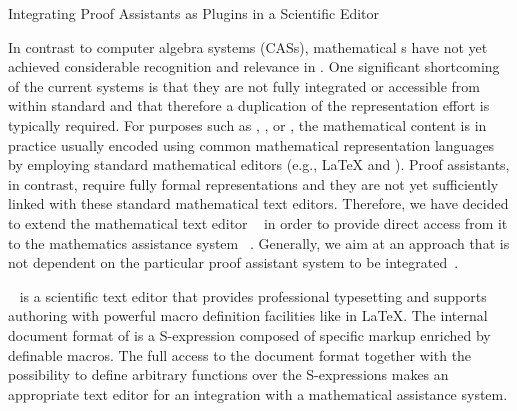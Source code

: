 
\begin{omgroup}[id=texmacs-omega,short=Proof Assistants in Scientific Editors,
  creators={autexier,benzmueller,fiedler,lesourd}]
    {Integrating Proof Assistants as Plugins  in a Scientific Editor}


In contrast to computer algebra systems (CASs), mathematical {s} have not yet achieved considerable recognition and relevance in
{}.  One significant shortcoming of the current systems is
that they are not fully integrated or accessible from within standard
{} and that therefore a duplication of the
representation effort is typically required. For purposes such as {},
{}, or {}, the mathematical content is in
practice usually encoded using common mathematical representation languages by employing
standard mathematical editors (e.g., {\LaTeX} and {\emacs}). Proof assistants, in
contrast, require fully formal representations and they are not yet sufficiently linked
with these standard mathematical text editors.  Therefore, we have decided to extend the
mathematical text editor {\texmacs}~\cite{VdH01} in order to provide direct access from it
to the mathematics assistance system {\OMEGA}~\cite{OMEGA02,SBA-05-a}. Generally, we aim
at an approach that is not dependent on the particular proof assistant system to be
integrated~\cite{ABFL-05-a}.

{\texmacs}~\cite{VdH01} is a scientific {} text editor that provides
professional typesetting and supports authoring with powerful macro definition facilities
like in {\LaTeX}. The internal document format of {\texmacs} is a {}
S-expression composed of {\texmacs} specific markup enriched by definable macros.  The
full access to the document format together with the possibility to define arbitrary
{} functions over the S-expressions makes {\texmacs} an appropriate text
editor for an integration with a mathematical assistance system.


\end{omgroup}
